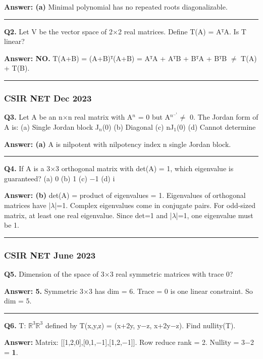 \documentclass[12pt,a4paper,openany]{book}
\begin{document}
{{\textbf{Answer: (a)} Minimal polynomial has no repeated roots  diagonalizable.

\bigskip\noindent\rule{\textwidth}{0.4pt}\bigskip

\textbf{Q2.} Let V be the vector space of 2$\times$2 real matrices. Define T(A) = AᵀA. Is T linear?

\textbf{Answer: NO.} T(A+B) = (A+B)ᵀ(A+B) = AᵀA + AᵀB + BᵀA + BᵀB $\neq$ T(A) + T(B).

\bigskip\noindent\rule{\textwidth}{0.4pt}\bigskip

\subsubsection{CSIR NET Dec 2023}
\textbf{Q3.} Let A be an n$\times$n real matrix with A$^n$ = 0 but A$^n^{-}^1\neq$ 0. The Jordan form of A is:
(a) Single Jordan block J$_n$(0)  (b) Diagonal  (c) nJ$_1$(0)  (d) Cannot determine

\textbf{Answer: (a)} A is nilpotent with nilpotency index n  single Jordan block.

\bigskip\noindent\rule{\textwidth}{0.4pt}\bigskip

\textbf{Q4.} If A is a 3$\times$3 orthogonal matrix with det(A) = 1, which eigenvalue is guaranteed?
(a) 0  (b) 1  (c) −1  (d) i

\textbf{Answer: (b)} det(A) = product of eigenvalues = 1. Eigenvalues of orthogonal matrices have |$\lambda$|=1. Complex eigenvalues come in conjugate pairs. For odd-sized matrix, at least one real eigenvalue. Since det=1 and |$\lambda$|=1, one eigenvalue must be 1.

\bigskip\noindent\rule{\textwidth}{0.4pt}\bigskip

\subsubsection{CSIR NET June 2023}
\textbf{Q5.} Dimension of the space of 3$\times$3 real symmetric matrices with trace 0?

\textbf{Answer: 5.} Symmetric 3$\times$3 has dim = 6. Trace = 0 is one linear constraint. So dim = 5.

\bigskip\noindent\rule{\textwidth}{0.4pt}\bigskip

\textbf{Q6.} T: $\mathbb{R}^3\mathbb{R}^3$ defined by T(x,y,z) = (x+2y, y−z, x+2y−z). Find nullity(T).

\textbf{Answer:} Matrix: [[1,2,0],[0,1,−1],[1,2,−1]]. Row reduce  rank = 2. Nullity = 3−2 = \textbf{1}.

}}
\end{document}
